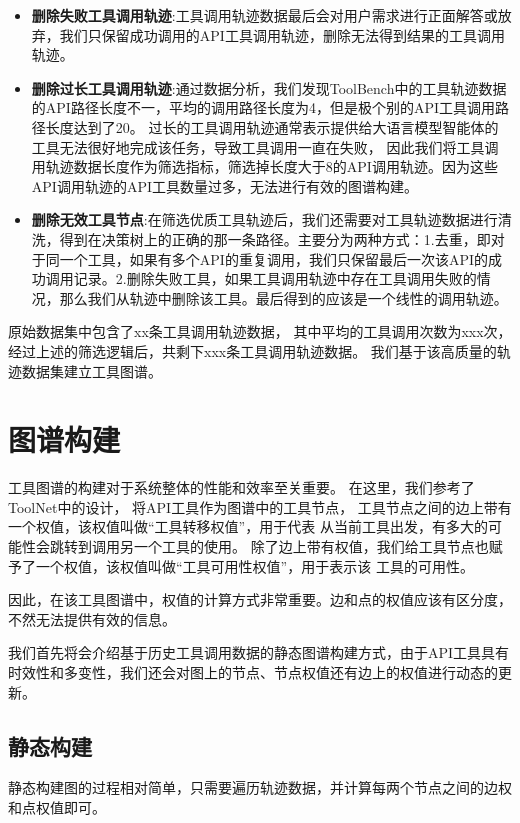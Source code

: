 \begin{itemize}
  \item \textbf{删除失败工具调用轨迹}:工具调用轨迹数据最后会对用户需求进行正面解答或放弃，我们只保留成功调用的API工具调用轨迹，删除无法得到结果的工具调用轨迹。
  \item \textbf{删除过长工具调用轨迹}:通过数据分析，我们发现ToolBench中的工具轨迹数据的API路径长度不一，平均的调用路径长度为4，但是极个别的API工具调用路径长度达到了20。
  过长的工具调用轨迹通常表示提供给大语言模型智能体的工具无法很好地完成该任务，导致工具调用一直在失败，
  因此我们将工具调用轨迹数据长度作为筛选指标，筛选掉长度大于8的API调用轨迹。因为这些API调用轨迹的API工具数量过多，无法进行有效的图谱构建。
  \item \textbf{删除无效工具节点}:在筛选优质工具轨迹后，我们还需要对工具轨迹数据进行清洗，得到在决策树上的正确的那一条路径。主要分为两种方式：1.去重，即对于同一个工具，如果有多个API的重复调用，我们只保留最后一次该API的成功调用记录。2.删除失败工具，如果工具调用轨迹中存在工具调用失败的情况，那么我们从轨迹中删除该工具。最后得到的应该是一个线性的调用轨迹。
\end{itemize}

原始数据集中包含了xx条工具调用轨迹数据，
其中平均的工具调用次数为xxx次，
经过上述的筛选逻辑后，共剩下xxx条工具调用轨迹数据。
我们基于该高质量的轨迹数据集建立工具图谱。

\section{图谱构建}

工具图谱的构建对于系统整体的性能和效率至关重要。
在这里，我们参考了ToolNet\cite{Liu2024}中的设计，
将API工具作为图谱中的工具节点，
工具节点之间的边上带有一个权值，该权值叫做“工具转移权值”，用于代表
从当前工具出发，有多大的可能性会跳转到调用另一个工具的使用。
除了边上带有权值，我们给工具节点也赋予了一个权值，该权值叫做“工具可用性权值”，用于表示该
工具的可用性。

因此，在该工具图谱中，权值的计算方式非常重要。边和点的权值应该有区分度，不然无法提供有效的信息。

我们首先将会介绍基于历史工具调用数据的静态图谱构建方式，由于API工具具有时效性和多变性，我们还会对图上的节点、节点权值还有边上的权值进行动态的更新。

\subsection{静态构建}

静态构建图的过程相对简单，只需要遍历轨迹数据，并计算每两个节点之间的边权和点权值即可。

